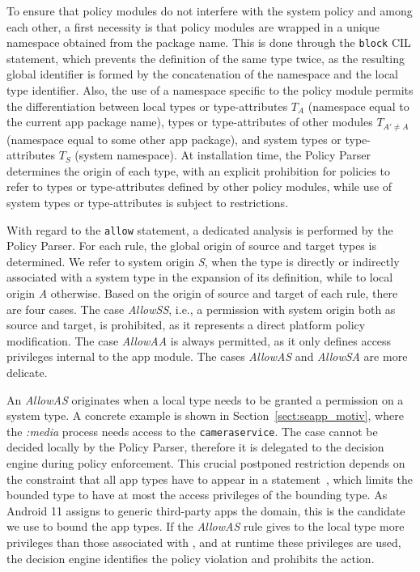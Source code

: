 To ensure that policy modules do not interfere with the system policy
and among each other, a first necessity is that policy modules are
wrapped in a unique namespace obtained from the package name.  This is
done through the {\tt block} CIL statement, which prevents the
definition of the same \sel type twice, as the resulting global
identifier is formed by the concatenation of the namespace and the
local type identifier.  Also, the use of a namespace specific to the
policy module permits the differentiation between local types or
type-attributes $T_A$ (namespace equal to the current app package
name), types or type-attributes of other modules $T_{A'\neq A}$
(namespace equal to some other app package), and system types or
type-attributes $T_S$ (system namespace).  At installation time, the
\seapp Policy Parser determines the origin of each type, with an
explicit prohibition for policies to refer to types or type-attributes
defined by other policy modules, while use of system types or
type-attributes is subject to restrictions.


With regard to the {\tt allow} statement, a dedicated analysis is
performed by the \seapp Policy Parser.  For each rule, the global origin
of source and target types is determined.  We refer to system origin
{\em S}, when the type is directly or indirectly associated with a
system type in the expansion of its definition, while to local origin
{\em A} otherwise.  Based on the origin of source and target of each
rule, there are four cases.  The case {\em AllowSS}, i.e., a
permission with system origin both as source and target, is
prohibited, as it represents a direct platform policy modification.
The case {\em AllowAA} is always permitted, as it only defines access
privileges internal to the app module.  The cases {\em AllowAS} and
{\em AllowSA} are more delicate.

An {\em AllowAS} originates when a local type needs to be granted a
permission on a system type.  A concrete example is shown in
Section~\ref{sect:seapp_motiv}, where the {\em :media} process needs
access to the {\tt camera\textunderscore service}.  The case cannot be
decided locally by the \seapp Policy Parser, therefore it is delegated
to the \sel decision engine during policy enforcement.  This crucial
postponed restriction depends on the constraint that all app types
have to appear in a \typebounds statement~\cite{seapp_typebounds},
which limits the bounded type to have at most the access privileges of
the bounding type.  As Android 11 assigns to generic third-party apps
the \untrustedapp domain, this is the candidate we use to bound the
app types.  If the {\em AllowAS} rule gives to the local type more
privileges than those associated with \untrustedapp, and at runtime
these privileges are used, the \sel decision engine identifies the
policy violation and prohibits the action.

